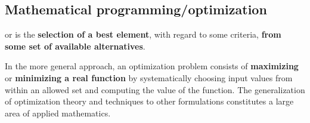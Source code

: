 \subsection{Mathematical programming/optimization}

 or  is the \textbf{selection of a best element}, with regard to some criteria, \textbf{from some set of available alternatives}.

In the more general approach, an optimization problem consists of \textbf{maximizing} or \textbf{minimizing a real function} by systematically choosing input values from within an allowed set and computing the value of the function. The generalization of optimization theory and techniques to other formulations constitutes a large area of applied mathematics.

